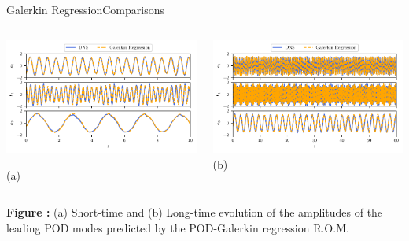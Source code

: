 \documentclass[usenames,dvipsnames,svgnames,10pt,aspectratio=169]{beamer}
\begin{document}
\begin{frame}[t, c]{Galerkin Regression}{Comparisons}
	\begin{columns}
		\begin{column}{.5\textwidth}
			\centering
			\includegraphics[width=.9\textwidth]{galerkin_regression_chronos}

			(a)
		\end{column}
		\begin{column}{.5\textwidth}
			\centering
			\includegraphics[width=.9\textwidth]{galerkin_regression_chronos_bis} \\

			(b)
		\end{column}

	\end{columns}

	\bigskip

	\textbf{Figure :} (a) Short-time and (b) Long-time evolution of the amplitudes of the leading POD modes predicted by the POD-Galerkin regression R.O.M.

	\vspace{0.5cm}
\end{frame}
\end{document}
